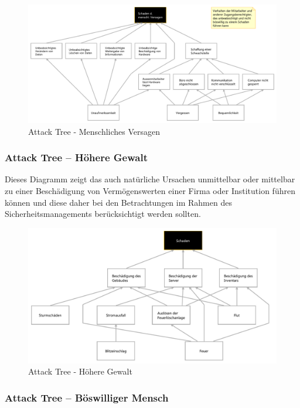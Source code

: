 \begin{figure}[h]
\includegraphics[scale=0.80, angle=90]{images/MenschlichesVersagen.pdf}
\caption{Attack Tree - Menschliches Versagen}
\end{figure}
\clearpage

\subsubsection{Attack Tree – Höhere Gewalt}

Dieses Diagramm zeigt das auch natürliche Ursachen unmittelbar oder mittelbar zu einer Beschädigung von Vermögenswerten einer Firma oder Institution führen können und diese daher bei den Betrachtungen im Rahmen des Sicherheitsmanagements berücksichtigt werden sollten.

\begin{figure}[h]
\includegraphics[scale=0.70, angle=90]{images/HoehereGewalt.pdf}
\caption{Attack Tree - Höhere Gewalt}
\end{figure}
\clearpage

\subsubsection{Attack Tree – Böswilliger Mensch}

